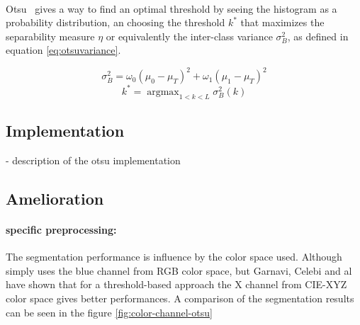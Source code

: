 \documentclass[a4paper,10pt]{article}
\DeclareMathOperator*{\argmax}{argmax}
\begin{document}
\paragraph{} Otsu~\cite{Otsu1979} 
gives a way to find an optimal threshold by seeing the histogram as a probability distribution, an choosing the threshold $k^*$ that maximizes the separability measure $\eta$ or equivalently the inter-class variance $\sigma_B^2$, as defined in equation \ref{eq:otsuvariance}.

\begin{equation} \label{eq:otsuvariance}
  \sigma_B^2 = \omega_0 (\mu_0 - \mu_T)^2 + \omega_1 (\mu_1 - \mu_T)^2 
\end{equation}
\begin{equation} \label{eq:optimthresh}
  k^* = \argmax_{1<k<L} \sigma_B^2(k)   
\end{equation}

\subsection{Implementation}
- description of the otsu implementation

\subsection{Amelioration}
\paragraph{specific preprocessing:}
The segmentation performance is influence by the color space used. Although~\cite{mendonca_comparison_2007} simply uses the blue channel from RGB color space, but 
Garnavi, Celebi and al~\cite{Garnavi2010} have shown that for a 
threshold-based approach the X channel from CIE-XYZ color space gives better performances. A comparison of the segmentation results can be seen in the figure \ref{fig:color-channel-otsu}
\end{document}
